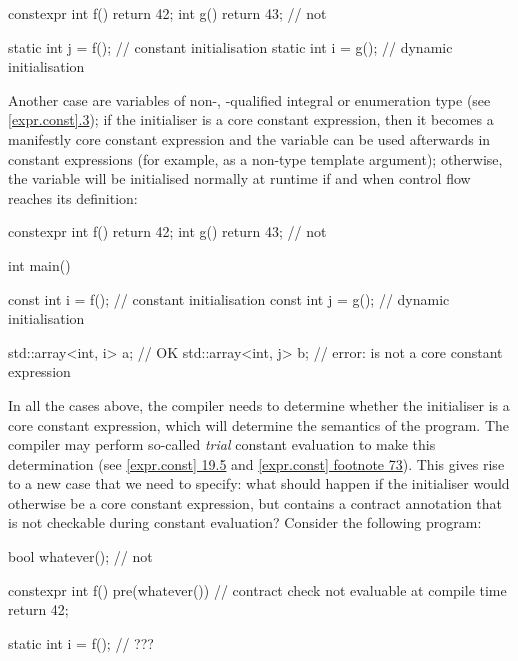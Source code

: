 \begin{codeblock}
constexpr int f() { return 42; }
int g() { return 43; }   // not 

static int j = f();      // constant initialisation
static int i = g();      // dynamic initialisation

\end{codeblock}

Another case are variables of non-, -qualified integral or enumeration type (see \href{https://eel.is/c++draft/expr.const#3}{[expr.const].3}); if the initialiser is a core constant expression, then it becomes a manifestly core constant expression and the variable can be used afterwards in constant expressions (for example, as a non-type template argument); otherwise, the variable will be initialised normally at runtime if and when control flow reaches its definition:

\begin{codeblock}
constexpr int f() { return 42; }
int g() { return 43; }   // not 

int main() {
  const int i = f();     // constant initialisation
  const int j = g();     // dynamic initialisation
  
  std::array<int, i> a;  // OK
  std::array<int, j> b;  // error:  is not a core constant expression
}
\end{codeblock}

In all the cases above, the compiler needs to determine whether the initialiser is a core constant expression, which will determine the semantics of the program. The compiler may perform so-called \emph{trial} constant evaluation to make this determination (see \href{https://eel.is/c++draft/expr.const#19.5}{[expr.const] 19.5} and \href{https://eel.is/c++draft/expr.const#footnote-73}{[expr.const] footnote 73}). This gives rise to a new case that we need to specify: what should happen if the initialiser would otherwise be a core constant expression, but contains a contract annotation that is not checkable during constant evaluation? Consider the following program:

\begin{codeblock}
bool whatever();     // not 

constexpr int f()
  pre(whatever())    // contract check not evaluable at compile time
{  
  return 42;
}

static int i = f();  // ???
\end{codeblock}

